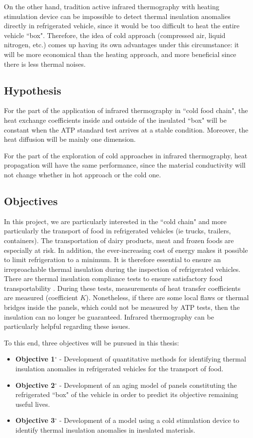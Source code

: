 On the other hand, tradition active infrared thermography with heating stimulation device can be impossible to detect thermal insulation anomalies directly in refrigerated vehicle, since it would be too difficult to heat the entire vehicle ``box". Therefore, the idea of cold approach (compressed air, liquid nitrogen, etc.) comes up having its own advantages under this circumstance: it will be more economical than the heating approach, and more beneficial since there is less thermal noises.

\subsection{Hypothesis}
For the part of the application of infrared thermography in ``cold food chain", the heat exchange coefficients inside and outside of the insulated ``box" will be constant when the ATP standard test arrives at a stable condition. Moreover, the heat diffusion will be mainly one dimension.

For the part of the exploration of cold approaches in infrared thermography, heat propagation will have the same performance, since the material conductivity will not change whether in hot approach or the cold one.
\subsection{Objectives}
In this project, we are particularly interested in the ``cold chain" and more particularly the transport of food in refrigerated vehicles (ie trucks, trailers, containers). The transportation of dairy products, meat and frozen foods are especially at risk. In addition, the ever-increasing cost of energy makes it possible to limit refrigeration to a minimum. It is therefore essential to ensure an irreproachable thermal insulation during the inspection of refrigerated vehicles. There are thermal insulation compliance tests to ensure satisfactory food transportability \citep{Geneva1970}. During these tests, measurements of heat transfer coefficients are measured (coefficient $ K $). Nonetheless, if there are some local flaws or thermal bridges inside the panels, which could not be measured by ATP tests, then the insulation can no longer be guaranteed. Infrared thermography can be particularly helpful regarding these issues. %

To this end, three objectives will be pursued in this thesis:
\begin{itemize}
	\item \textbf{Objective 1$ ^\circ $ } - Development of quantitative methods for identifying thermal insulation anomalies in refrigerated vehicles for the transport of food.
	\item \textbf{Objective 2$ ^\circ $ } - Development of an aging model of panels constituting the refrigerated ``box" of the vehicle in order to predict its objective remaining useful lives. 
	\item \textbf{Objective 3$ ^\circ $ } - Development of a model using a cold stimulation device to identify thermal insulation anomalies in insulated materials.
\end{itemize}

